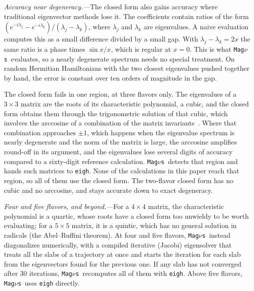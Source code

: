 \documentclass[final,5p,times,twocolumn,sort,compress]{elsarticle}
\makeatletter
\DeclareRobustCommand{\_}{%
  \ifmmode\nfss@text{\textunderscore}\else\textunderscore\allowbreak\fi}
\newcommand{\magnus}{{\tt Mag}\ensuremath{\nu}{\tt s}}
\makeatother
\begin{document}
\smallskip

\textit{Accuracy near degeneracy.---}The closed form also gains accuracy where traditional eigenvector methods lose it. The coefficients contain ratios of the form $(e^{-i\lambda_j} - e^{-i\lambda_k})/(\lambda_j - \lambda_k)$, where $\lambda_j$ and $\lambda_k$ are eigenvalues. A naive evaluation computes this as a small difference divided by a small gap. With $\lambda_j - \lambda_k = 2x$ the same ratio is a phase times $\sin x / x$, which is regular at $x = 0$. This is what \magnus\ evaluates, so a nearly degenerate spectrum needs no special treatment. On random Hermitian Hamiltonians with the two closest eigenvalues pushed together by hand, the error is constant over ten orders of magnitude in the gap.

The closed form fails in one region, at three flavors only. The eigenvalues of a $3 \times 3$ matrix are the roots of its characteristic polynomial, a cubic, and the closed form obtains them through the trigonometric solution of that cubic, which involves the arccosine of a combination of the matrix invariants~\cite{MacFarlane:1968vc}. Where that combination approaches $\pm 1$, which happens when the eigenvalue spectrum is nearly degenerate and the norm of the matrix is large, the arccosine amplifies round-off in its argument, and the eigenvalues lose several digits of accuracy compared to a sixty-digit reference calculation. \magnus\ detects that region and hands such matrices to {\tt eigh}. None of the calculations in this paper reach that region, so all of them use the closed form. The two-flavor closed form has no cubic and no arccosine, and stays accurate down to exact degeneracy.

\smallskip

\textit{Four and five flavors, and beyond.---}For a $4 \times 4$ matrix, the characteristic polynomial is a quartic, whose roots have a closed form too unwieldy to be worth evaluating; for a $5 \times 5$ matrix, it is a quintic, which has no general solution in radicals (the Abel--Ruffini theorem). At four and five flavors, \magnus\ instead diagonalizes numerically, with a compiled iterative (Jacobi) eigensolver that treats all the slabs of a trajectory at once and starts the iteration for each slab from the eigenvectors found for the previous one. If any slab has not converged after 30 iterations, \magnus\ recomputes all of them with {\tt eigh}. Above five flavors, \magnus\ uses {\tt eigh} directly.

\end{document}
